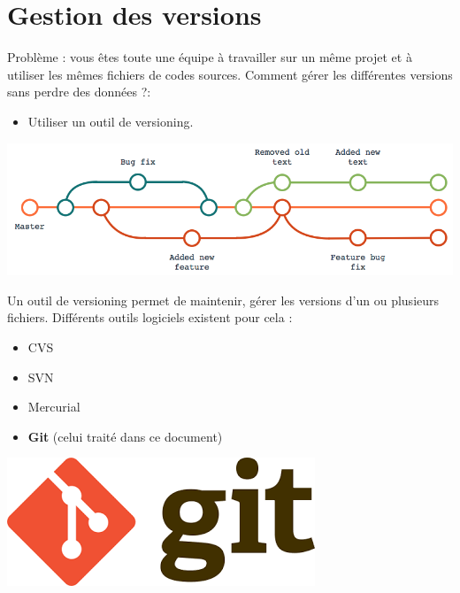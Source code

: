 \documentclass[french, 12pt]{article}%
\newcommand{\itemE}{\item[$\bullet$]}
\begin{document}
\vspace{0.25cm}

\section{Gestion des versions}

Problème : vous êtes toute une équipe à travailler sur un même projet et à utiliser les mêmes fichiers de codes sources. Comment gérer les différentes versions sans perdre des données ?: 
\begin{itemize}
\itemE Utiliser un outil de versioning.
\end{itemize}

\begin{center}
\includegraphics[scale=0.5]{./ressource/master_branche.png}
\end{center}

Un outil de versioning permet de maintenir, gérer les versions d'un ou plusieurs fichiers. Différents outils logiciels existent pour cela : 
\begin{itemize}
\itemE CVS
\itemE SVN 
\itemE Mercurial
\itemE \textbf{Git} (celui traité dans ce document)
\end{itemize}

\begin{center}
\includegraphics[scale=0.4]{./ressource/git_logo.png}
\end{center}
\end{document}
